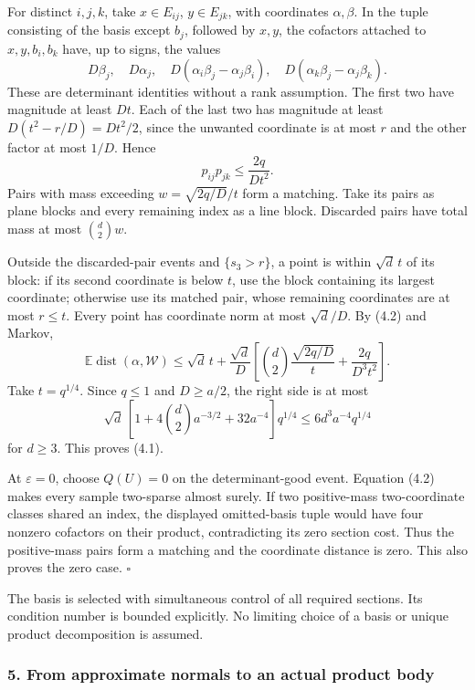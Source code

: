 \documentclass[
  11pt,
]{article}
\begin{document}
For distinct \(i,j,k\), take \(x\in E_{ij}\), \(y\in E_{jk}\), with
coordinates \(\alpha,\beta\). In the tuple consisting of the basis
except \(b_j\), followed by \(x,y\), the cofactors attached to
\(x,y,b_i,b_k\) have, up to signs, the values \[
 D\beta_j,\quad D\alpha_j,\quad
 D(\alpha_i\beta_j-\alpha_j\beta_i),\quad
 D(\alpha_k\beta_j-\alpha_j\beta_k).
\] These are determinant identities without a rank assumption. The first
two have magnitude at least \(Dt\). Each of the last two has magnitude
at least \(D(t^2-r/D)=Dt^2/2\), since the unwanted coordinate is at most
\(r\) and the other factor at most \(1/D\). Hence \[
 p_{ij}p_{jk}\le\frac{2q}{Dt^2}.
\] Pairs with mass exceeding \(w=\sqrt{2q/D}/t\) form a matching. Take
its pairs as plane blocks and every remaining index as a line block.
Discarded pairs have total mass at most \(\binom d2w\).

Outside the discarded-pair events and \(\{s_3>r\}\), a point is within
\(\sqrt d\,t\) of its block: if its second coordinate is below \(t\),
use the block containing its largest coordinate; otherwise use its
matched pair, whose remaining coordinates are at most \(r\le t\). Every
point has coordinate norm at most \(\sqrt d/D\). By (4.2) and Markov, \[
 \mathbb E\operatorname{dist}(\alpha,\mathcal W)
 \le\sqrt d\,t+\frac{\sqrt d}{D}
 \left[\binom d2\frac{\sqrt{2q/D}}t+\frac{2q}{D^3t^2}\right].     \tag{4.3}
\] Take \(t=q^{1/4}\). Since \(q\le1\) and \(D\ge a/2\), the right side
is at most \[
 \sqrt d\,[1+4\binom d2a^{-3/2}+32a^{-4}]q^{1/4}
 \le6d^3a^{-4}q^{1/4}
\] for \(d\ge3\). This proves (4.1).

At \(\varepsilon=0\), choose \(Q(U)=0\) on the determinant-good event.
Equation (4.2) makes every sample two-sparse almost surely. If two
positive-mass two-coordinate classes shared an index, the displayed
omitted-basis tuple would have four nonzero cofactors on their product,
contradicting its zero section cost. Thus the positive-mass pairs form a
matching and the coordinate distance is zero. This also proves the zero
case. \(\square\)

The basis is selected with simultaneous control of all required
sections. Its condition number is bounded explicitly. No limiting choice
of a basis or unique product decomposition is assumed.

\subsubsection{5. From approximate normals to an actual product
body}\label{from-approximate-normals-to-an-actual-product-body}
\end{document}
